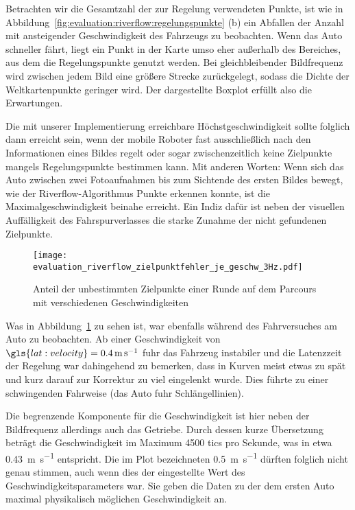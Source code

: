 Betrachten wir die Gesamtzahl der zur Regelung verwendeten Punkte, ist wie in Abbildung~\ref{fig:evaluation:riverflow:regelungspunkte} (b) ein Abfallen der Anzahl mit ansteigender Geschwindigkeit des Fahrzeugs zu beobachten. Wenn das Auto schneller fährt, liegt ein Punkt in der Karte umso eher außerhalb des Bereiches, aus dem die Regelungspunkte genutzt werden. Bei gleichbleibender Bildfrequenz wird zwischen jedem Bild eine größere Strecke zurückgelegt, sodass die Dichte der Weltkartenpunkte geringer wird. Der dargestellte Boxplot erfüllt also die Erwartungen.

Die mit unserer Implementierung erreichbare Höchstgeschwindigkeit sollte folglich dann erreicht sein, wenn der mobile Roboter fast ausschließlich nach den Informationen eines Bildes regelt oder sogar zwischenzeitlich keine Zielpunkte mangels Regelungspunkte bestimmen kann. Mit anderen Worten: Wenn sich das Auto zwischen zwei Fotoaufnahmen bis zum Sichtende des ersten Bildes bewegt, wie der Riverflow-Algorithmus Punkte erkennen konnte, ist die Maximalgeschwindigkeit beinahe erreicht. Ein Indiz dafür ist neben der visuellen Auffälligkeit des Fahrspurverlasses die starke Zunahme der nicht gefundenen Zielpunkte. 

\begin{figure}[htbp] %
	\centering
	\texttt{[image: evaluation\_riverflow\_zielpunktfehler\_je\_geschw\_3Hz.pdf]}
	\caption{Anteil der unbestimmten Zielpunkte einer Runde auf dem Parcours mit verschiedenen Geschwindigkeiten}
	\label{fig:evaluation:riverflow:zielpunktfehler_je_geschw}
\end{figure}

Was in Abbildung~\ref{fig:evaluation:riverflow:zielpunktfehler_je_geschw} zu sehen ist, war ebenfalls während des Fahrversuches am Auto zu beobachten. Ab einer Geschwindigkeit von \( \gls{lat:velocity} = \SI{0,4}{\metre\per\second} \) fuhr das Fahrzeug instabiler und die Latenzzeit der Regelung war dahingehend zu bemerken, dass in Kurven meist etwas zu spät und kurz darauf zur Korrektur zu viel eingelenkt wurde. Dies führte zu einer schwingenden Fahrweise (das Auto fuhr \glqq Schlängellinien\grqq). 

Die begrenzende Komponente für die Geschwindigkeit ist hier neben der Bildfrequenz allerdings auch das Getriebe. Durch dessen kurze Übersetzung beträgt die Geschwindigkeit im Maximum 4500 tics pro Sekunde, was in etwa \SI{0,43}{\metre\per\second} entspricht. Die im Plot bezeichneten \SI{0,5}{\metre\per\second} dürften folglich nicht genau stimmen, auch wenn dies der eingestellte Wert des Geschwindigkeitsparameters war. Sie geben die Daten zu der dem ersten Auto maximal physikalisch möglichen Geschwindigkeit an. 

